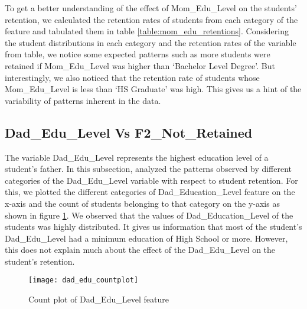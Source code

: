\documentclass[11pt,openright]{report}
\begin{document}
To get a better understanding of the effect of Mom\_Edu\_Level on the students' retention, we calculated the retention rates of students from each category of the feature and tabulated them in table \ref{table:mom_edu_retentions}. Considering the student distributions in each category and the retention rates of the variable from table, we notice some expected patterns such as more students were retained if Mom\_Edu\_Level was higher than `Bachelor Level Degree'. But interestingly, we also noticed that the retention rate of students whose Mom\_Edu\_Level is less than `HS Graduate' was high. This gives us a hint of the variability of patterns inherent in the data.


\subsection {Dad\_Edu\_Level Vs F2\_Not\_Retained}
The variable Dad\_Edu\_Level represents the highest education level of a student's father. In this subsection, analyzed the patterns observed by different categories of the Dad\_Edu\_Level variable with respect to student retention. For this, we plotted the different categories of Dad\_Education\_Level feature on the x-axis and the count of students belonging to that category on the y-axis as shown in figure \ref{fig:dad_edu_F2NotRetained_plot}. We observed that the values of Dad\_Education\_Level of the students was highly distributed. It gives us information that most of the student's Dad\_Edu\_Level had a minimum education of High School or more. However, this does not explain much about the effect of the Dad\_Edu\_Level on the student's retention.


\begin{figure}[!ht]
	\centering
	\texttt{[image: dad\_edu\_countplot]}
	\caption{Count plot of Dad\_Edu\_Level feature }
	\label{fig:dad_edu_F2NotRetained_plot}
\end{figure}
\end{document}
